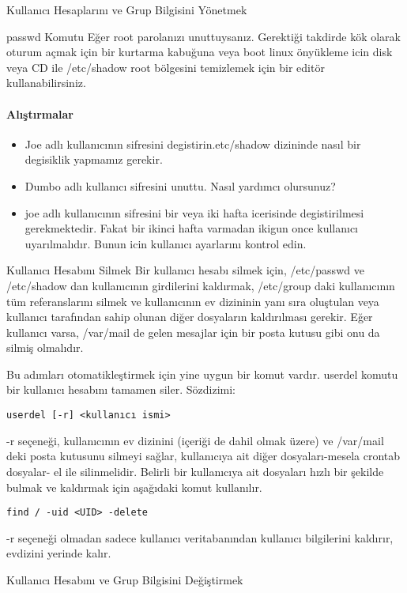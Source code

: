 \begin{section}{Kullanıcı Hesaplarını ve Grup Bilgisini Yönetmek}
\begin{subsection}{passwd Komutu}
Eğer root parolanızı unuttuysanız. Gerektiği takdirde kök olarak oturum açmak için bir kurtarma kabuğuna veya boot linux önyükleme icin disk veya CD ile /etc/shadow root bölgesini temizlemek için bir editör kullanabilirsiniz.
\paragraph{Alıştırmalar}{
\begin{itemize}
\item Joe adlı kullanıcının  sifresini degistirin.etc/shadow dizininde nasıl bir degisiklik yapmamız gerekir.
\item Dumbo adlı kullanıcı sifresini unuttu. Nasıl yardımcı olursunuz?
\item joe adlı kullanıcının sifresini bir veya iki hafta icerisinde degistirilmesi gerekmektedir. Fakat bir ikinci hafta varmadan ikigun once kullanıcı uyarılmalıdır. Bunun icin kullanıcı ayarlarını kontrol edin.
\end{itemize}}
\end{subsection}
\begin{subsection}{Kullanıcı Hesabını Silmek}
Bir kullanıcı hesabı silmek için, /etc/passwd ve /etc/shadow dan kullanıcının girdilerini kaldırmak, /etc/group daki kullanıcının tüm referanslarını silmek ve kullanıcının ev dizininin yanı sıra oluştulan veya kullanıcı tarafından sahip olunan diğer dosyaların kaldırılması gerekir. Eğer kullanıcı varsa, /var/mail de gelen mesajlar için bir posta kutusu gibi onu da silmiş olmalıdır.

Bu adımları otomatikleştirmek için yine uygun bir komut vardır. userdel komutu bir kullanıcı hesabını tamamen siler. Sözdizimi:
\begin{verbatim}
userdel [-r] <kullanıcı ismi>
\end{verbatim}

-r seçeneği, kullanıcının ev dizinini (içeriği de dahil olmak üzere) ve /var/mail deki posta kutusunu silmeyi sağlar, kullanıcıya ait diğer dosyaları-mesela crontab dosyalar- el ile silinmelidir. Belirli bir kullanıcıya ait dosyaları hızlı bir şekilde bulmak ve kaldırmak için aşağıdaki komut kullanılır.
\begin{verbatim}
find / -uid <UID> -delete
\end{verbatim}
-r seçeneği olmadan sadece kullanıcı veritabanından kullanıcı bilgilerini kaldırır, evdizini yerinde kalır.
\end{subsection}
\begin{subsection}{Kullanıcı Hesabını ve Grup Bilgisini Değiştirmek}


\end{subsection}
\end{section}
